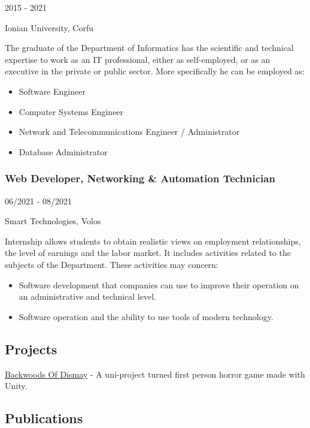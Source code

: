 \documentclass[
  english,
]{article}
\providecommand{\tightlist}{%
  \setlength{\itemsep}{0pt}\setlength{\parskip}{0pt}}
\begin{document}
2015 - 2021

Ionian University, Corfu

The graduate of the Department of Informatics has the scientific and
technical expertise to work as an IT professional, either as
self-employed, or as an executive in the private or public sector. More
specifically he can be employed as:

\begin{itemize}
\tightlist
\item
  Software Engineer
\item
  Computer Systems Engineer
\item
  Network and Telecommunications Engineer / Administrator
\item
  Database Administrator
\end{itemize}

\hypertarget{web-developer-networking-automation-technician}{%
\subsubsection{Web Developer, Networking \& Automation
Technician}\label{web-developer-networking-automation-technician}}

06/2021 - 08/2021

Smart Technologies, Volos

Internship allows students to obtain realistic views on employment
relationships, the level of earnings and the labor market. It includes
activities related to the subjects of the Department. These activities
may concern:

\begin{itemize}
\tightlist
\item
  Software development that companies can use to improve their operation
  on an administrative and technical level.
\item
  Software operation and the ability to use tools of modern technology.
\end{itemize}

\hypertarget{projects}{%
\subsection{\texorpdfstring{{ \emph{} \emph{} }
Projects}{    Projects}}\label{projects}}

{ \protect\hyperlink{}{Backwoods Of Dismay} } - {A uni-project turned
first person horror game made with Unity.}

\hypertarget{publications}{%
\subsection{\texorpdfstring{{ \emph{} \emph{} }
Publications}{    Publications}}\label{publications}}
\end{document}
